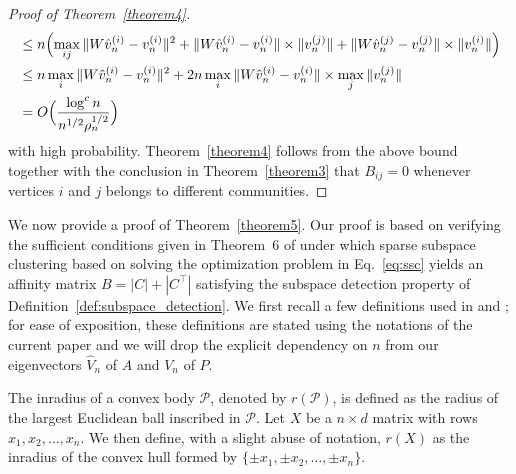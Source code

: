 \documentclass[12pt]{article}
\begin{document}
\begin{proof}[Proof of Theorem~\ref{theorem4}]
\[\begin{split}
& \leq n \Bigl(\max_{ij}  \|W \hat{v}_n^{(i)}  - v_n^{(i)} \|^2 +  \|W
\hat{v}_n^{(i)}  - v_n^{(i)} \| \times \|v_n^{(j)}\| +  \|W \hat{v}_n^{(j)}  - v_n^{(j)} \| \times \|v_n^{(i)}\|\Bigr) 
\\ &
\leq n \max_{i} \|W \hat{v}_n^{(i)}  - v_n^{(i)} \|^2 + 2n \max_{i}
\|W \hat{v}_n^{(i)}  - v_n^{(i)} \| \times \max_{j} \|v_n^{(j)}\|
\\
& = O \Big( \frac{\log^{c}{n}}{n^{1/2} \rho_n^{1/2}} \Big)
\end{split}\]
with high probability.
Theorem~\ref{theorem4} follows from the above bound together with the
conclusion in Theorem~\ref{theorem3} that $B_{ij} = 0$ whenever vertices $i$ and $j$
belongs to different communities. 
\end{proof}

We now provide a proof of Theorem~\ref{theorem5}. Our proof is based
on verifying the sufficient conditions given in Theorem~6 of
\cite{jmlr-v28-wang13}
under which sparse subspace clustering based on solving the
optimization problem in Eq.~\eqref{eq:ssc} yields an affinity matrix
$B = |C| + |C^{\top}|$ satisfying the subspace detection property of
Definition~\ref{def:subspace_detection}. We first recall a few
definitions used in \citet{soltanolkotabi2012} and \citet{jmlr-v28-wang13}; for ease of exposition,
these definitions are stated using the notations of the current
paper and we will drop the explicit dependency on $n$ from our
eigenvectors $\hat{V}_n$ of $A$ and $V_n$ of $P$.
\begin{definition}[Inradius]
  \label{inradius}
The inradius of a convex body $\mathcal{P}$, denoted by $r(\mathcal{P})$, is
defined as the radius of the largest Euclidean ball inscribed in $\mathcal{P}$.
Let $X$ be a $n \times d$ matrix with rows $x_1, x_2, \dots,
x_n$. We then define, with a slight abuse of notation, $r(X)$ as the
inradius of the convex hull formed by $\{\pm x_1, \pm x_2, \dots, \pm x_n\}$. 
\end{definition}
\end{document}
